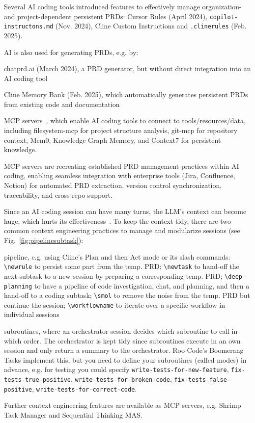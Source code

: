 \documentclass[twocolumn]{article}
\begin{document}
Several AI coding tools introduced features to effectively manage organization- and project-dependent persistent PRDs:
Cursor Rules (April 2024), \lstinline|copilot-instructons.md| (Nov. 2024), Cline Custom Instructions and \lstinline|.clinerules| (Feb. 2025).

AI is also used for generating PRDs, e.g. by:
\begin{compactitem}
\item chatprd.ai (March 2024), a PRD generator, but without direct integration into an AI coding tool
\item Cline Memory Bank (Feb. 2025), which automatically generates persistent PRDs from existing code and documentation
\item MCP servers~\cite{URL:mcp}, which enable AI coding tools to connect to tools/resources/data,
  including filesystem-mcp for project structure analysis, git-mcp for repository context, Mem0, Knowledge Graph Memory, and Context7 for persistent knowledge.
\end{compactitem}
MCP servers are recreating established PRD management practices within AI coding,
enabling seamless integration with enterprise tools (Jira, Confluence, Notion) for automated PRD extraction,
version control synchronization, traceability, and cross-repo support.

Since an AI coding session can have many turns, the LLM's context can become huge, which hurts its effectiveness~\cite{KH25}.
To keep the context tidy, there are two common context engineering practices to manage and modularize sessions
(see Fig.~\ref{fig:pipelinesubtask}):
\begin{compactitem}
\item pipeline, e.g. using Cline's Plan and then Act mode or its slash commands: 
\lstinline|\newrule| to persist some part from the temp. PRD;
\lstinline|\newtask| to hand-off the next subtask to a new session by preparing a corresponding temp. PRD;
\lstinline|\deep-planning| to have a pipeline of code investigation, chat, and planning,
and then a hand-off to a coding subtask;
\lstinline|\smol| to remove the noise from the temp. PRD but continue the session;
\lstinline|\workflowname| to iterate over a specific workflow in individual sessions
\item subroutines, where an orchestrator session decides which subroutine to call in which order.
The orchestrator is kept tidy since subroutines execute in an own session and only return a summary to the orchestrator.
Roo Code's Boomerang Tasks implement this, but you need to define your subroutines (called modes) in advance,
e.g. for testing you could specify
  \lstinline|write-tests-for-new-feature|, \lstinline|fix-tests-true-positive|, \lstinline|write-tests-for-broken-code|,
  \lstinline|fix-tests-false-positive|, \lstinline|write-tests-for-correct-code|.
\end{compactitem}
Further context engineering features are available as MCP servers, e.g. Shrimp Task Manager and Sequential Thinking MAS.
\end{document}

